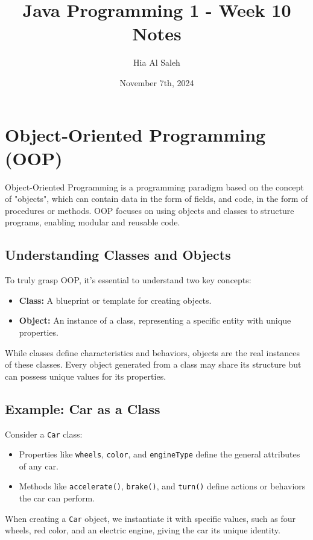 \documentclass{article}
\title{Java Programming 1 - Week 10 Notes}
\author{Hia Al Saleh}
\date{November 7th, 2024}
\begin{document}
\maketitle
\tableofcontents
\newpage 

\section{Object-Oriented Programming (OOP)}
Object-Oriented Programming is a programming paradigm based on the concept of "objects", which can contain data in the form of fields, and code, in the form of procedures or methods. OOP focuses on using objects and classes to structure programs, enabling modular and reusable code. 

\subsection{Understanding Classes and Objects}
To truly grasp OOP, it's essential to understand two key concepts:
\begin{itemize}
    \item \textbf{Class:} A blueprint or template for creating objects. 
    \item \textbf{Object:} An instance of a class, representing a specific entity with unique properties.
\end{itemize}

While classes define characteristics and behaviors, objects are the real instances of these classes. Every object generated from a class may share its structure but can possess unique values for its properties.

\subsection{Example: Car as a Class}
Consider a \texttt{Car} class:
\begin{itemize}
    \item Properties like \texttt{wheels}, \texttt{color}, and \texttt{engineType} define the general attributes of any car.
    \item Methods like \texttt{accelerate()}, \texttt{brake()}, and \texttt{turn()} define actions or behaviors the car can perform.
\end{itemize}
When creating a \texttt{Car} object, we instantiate it with specific values, such as four wheels, red color, and an electric engine, giving the car its unique identity.
\end{document}
